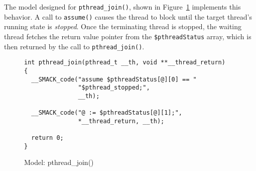 The model designed for \lstinline|pthread_join()|, shown in
Figure~\ref{fig:pthread_join} implements this behavior.  A call to
\lstinline|assume()| causes the thread to block until the target
thread's running state is \emph{stopped}.  Once the terminating thread
is stopped, the waiting thread fetches the return value pointer from
the \lstinline|$pthreadStatus| array, which is then returned by the
call to \lstinline|pthread_join()|.

\begin{figure}[h]
\centering
\caption{Model: pthread\_join()}\label{fig:pthread_join}
\begin{lstlisting}
int pthread_join(pthread_t __th, void **__thread_return)
{
  __SMACK_code("assume $pthreadStatus[@][0] == "
               "$pthread_stopped;",
               __th);

  __SMACK_code("@ := $pthreadStatus[@][1];",
               *__thread_return, __th);

  return 0;
}

\end{lstlisting}
\end{figure}

